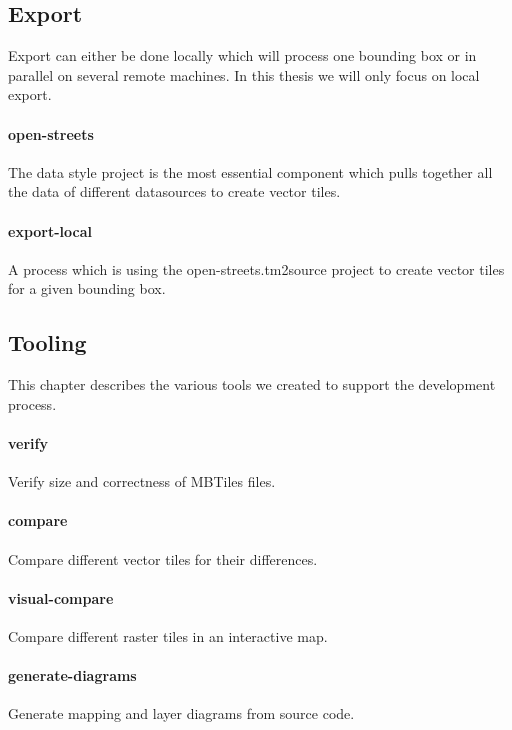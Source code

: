 \newpage
\subsection{Export}
Export can either be done locally which will process one bounding box or in parallel on several
remote machines. In this thesis we will only focus on local export.

\paragraph{open-streets}
The data style project is the most essential component which pulls together all the
data of different datasources to create vector tiles. 

\paragraph{export-local}
A process which is using the open-streets.tm2source project to create vector tiles for a given bounding box.

\subsection{Tooling}

This chapter describes the various tools we created to support the development process.

\paragraph{verify}
Verify size and correctness of MBTiles files.

\paragraph{compare}
Compare different vector tiles for their differences.

\paragraph{visual-compare}
Compare different raster tiles in an interactive map.

\paragraph{generate-diagrams}
Generate mapping and layer diagrams from source code.

